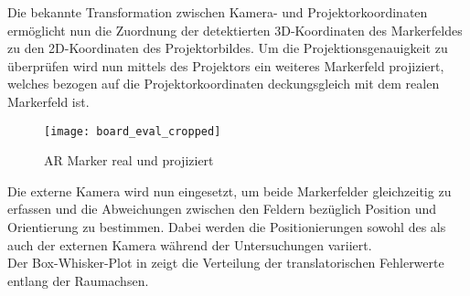 Die bekannte Transformation zwischen Kamera- und Projektorkoordinaten ermöglicht nun die Zuordnung der detektierten 3D-Koordinaten des Markerfeldes zu den 2D-Koordinaten des Projektorbildes. Um die Projektionsgenauigkeit zu überprüfen wird nun mittels des Projektors ein weiteres Markerfeld projiziert, welches bezogen auf die Projektorkoordinaten deckungsgleich mit dem realen Markerfeld ist. \\

\begin{figure}[!ht]
	\begin{center}
		\texttt{[image: board\_eval\_cropped]}
		\caption{AR Marker real und projiziert}
		\label{fig.arprojected}
	\end{center}
\end{figure}

Die externe Kamera wird nun eingesetzt, um beide Markerfelder gleichzeitig zu erfassen und die Abweichungen zwischen den Feldern bezüglich Position und Orientierung zu bestimmen. Dabei werden die Positionierungen sowohl des  als auch der externen Kamera während der Untersuchungen variiert. \red[Die Bestimmung der Fehlerwerte erfolgt erneut über Berechnung des QMW.\\
Die Ergebnisse der $n=6$ Messreihen sind in \tab{projection} zusammengefasst.]\\
Der Box-Whisker-Plot in  zeigt die Verteilung der translatorischen Fehlerwerte entlang der Raumachsen.\\

